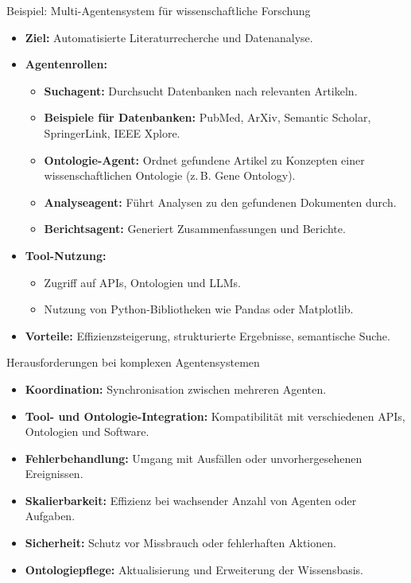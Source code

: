 \documentclass[aspectratio=1610, xcolor=dvipsnames, 9pt]{beamer}
\begin{document}
\begin{frame}{Beispiel: Multi-Agentensystem für wissenschaftliche Forschung}
  \begin{itemize}
    \item \textbf{Ziel:} Automatisierte Literaturrecherche und Datenanalyse.
    \item \textbf{Agentenrollen:}
      \begin{itemize}
        \item \textbf{Suchagent:} Durchsucht Datenbanken nach relevanten Artikeln.
        \item \textbf{Beispiele für Datenbanken:} PubMed, ArXiv, Semantic Scholar, SpringerLink, IEEE Xplore.
        \item \textbf{Ontologie-Agent:} Ordnet gefundene Artikel zu Konzepten einer wissenschaftlichen Ontologie (z. B. Gene Ontology).
        \item \textbf{Analyseagent:} Führt Analysen zu den gefundenen Dokumenten durch.
        \item \textbf{Berichtsagent:} Generiert Zusammenfassungen und Berichte.
      \end{itemize}
    \item \textbf{Tool-Nutzung:}
      \begin{itemize}
        \item Zugriff auf APIs, Ontologien und LLMs.
        \item Nutzung von Python-Bibliotheken wie Pandas oder Matplotlib.
      \end{itemize}
    \item \textbf{Vorteile:} Effizienzsteigerung, strukturierte Ergebnisse, semantische Suche.
  \end{itemize}
\end{frame}

\begin{frame}{Herausforderungen bei komplexen Agentensystemen}
  \begin{itemize}
    \item \textbf{Koordination:} Synchronisation zwischen mehreren Agenten.
    \item \textbf{Tool- und Ontologie-Integration:} Kompatibilität mit verschiedenen APIs, Ontologien und Software.
    \item \textbf{Fehlerbehandlung:} Umgang mit Ausfällen oder unvorhergesehenen Ereignissen.
    \item \textbf{Skalierbarkeit:} Effizienz bei wachsender Anzahl von Agenten oder Aufgaben.
    \item \textbf{Sicherheit:} Schutz vor Missbrauch oder fehlerhaften Aktionen.
    \item \textbf{Ontologiepflege:} Aktualisierung und Erweiterung der Wissensbasis.
  \end{itemize}
\end{frame}
\end{document}
